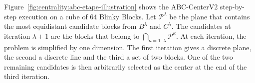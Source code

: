 

Figure~\ref{fig:centrality:abc-etape-illustration} shows the ABC-CenterV2 step-by-step execution on a cube of 64 Blinky Blocks. Let $\mathscr{P}^\lambda$ be the plane that contains the most equidistant candidate blocks from $B^\lambda$ and $C^\lambda$. The candidates at iteration $\lambda+1$ are the blocks that belong to $\bigcap\limits_{\kappa = 1..\lambda} \mathscr{P}^\kappa$. At each iteration, the problem is simplified by one dimension. The first iteration gives a discrete plane, the second a discrete line and the third a set of two blocks. One of the two remaining candidates is then arbitrarily selected as the center at the end of the third iteration.


